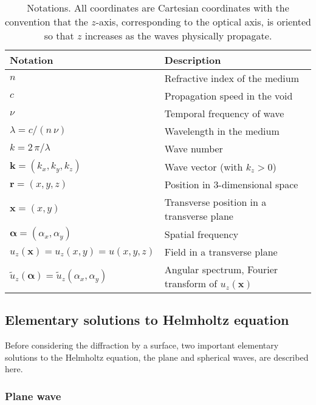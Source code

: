 \documentclass[a4paper]{article}
\newcommand{\V}[1]{\boldsymbol{#1}}
\newcommand*{\FT}[1]{\widetilde{#1}}
\begin{document}
\begin{table}[t]
  \centering
  \begin{tabular}{ll}
    Notation & Description \\
    \hline
    $n$ & Refractive index of the medium\\
    $c$ & Propagation speed in the void\\
    $ν$ & Temporal frequency of wave\\
    $λ= c/(n\,ν)$ & Wavelength in the medium\\
    $k = 2\,π/λ$ & Wave number\\
    $\V{k} = (k_{x},k_{y},k_{z})$ & Wave vector (with $k_{z} > 0$)\\
    $\V{r} = (x,y,z)$ & Position in 3-dimensional space\\
    $\V{x} = (x,y)$ & Transverse position in a transverse plane\\
    $\V{α} = (α_{x},α_{y})$ & Spatial frequency\\
    $u_{z}(\V{x}) = u_{z}(x,y) = u(x,y,z)$ & Field in a transverse plane\\
    $\FT{u}_{z}(\V{α}) = \FT{u}_{z}(α_{x},α_{y})$
             & Angular spectrum, Fourier transform of $u_{z}(\V{x})$\\
  \end{tabular}
  \caption{Notations. All coordinates are Cartesian coordinates with the
    convention that the $z$-axis, corresponding to the optical axis, is
    oriented so that $z$ increases as the waves physically propagate.}
  \label{tab:notations}
\end{table}


\subsection{Elementary solutions to Helmholtz equation}
\label{sec:elementary-solutions}

Before considering the diffraction by a surface, two important elementary
solutions to the Helmholtz equation, the plane and spherical waves, are
described here.

\subsubsection{Plane wave}
\label{sec:plane_wave}
\end{document}

